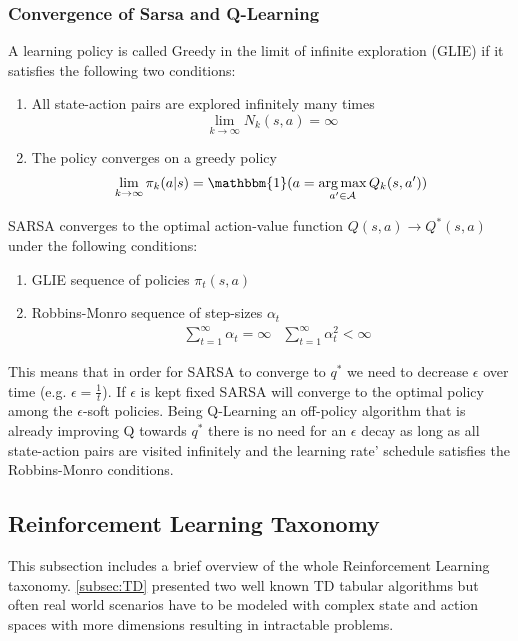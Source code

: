 \subsubsection{Convergence of Sarsa and Q-Learning}
\begin{definition}
    A learning policy is called Greedy in the limit of infinite exploration (GLIE) if it satisfies the following two conditions:
    \begin{enumerate}
        \item All state-action pairs are explored infinitely many times
        \begin{equation*}
            \lim_{k \to \infty}N_k(s,a) = \infty
        \end{equation*}
        \item The policy converges on a greedy policy
        \begin{equation*}
            \lim_{k \to \infty} \pi_k(a|s) = \mathbbm{1}(a = \argmax_{a' \in \mc{A}}Q_k(s,a'))
        \end{equation*}
    \end{enumerate}
\end{definition}

\begin{theorem}
    SARSA converges to the optimal action-value function $Q(s,a) \to Q^*(s,a)$ under the following conditions:
    \begin{enumerate}
        \item GLIE sequence of policies $\pi_t(s,a)$
        \item Robbins-Monro sequence of step-sizes $\alpha_t$
            \begin{align*}
                &\sum_{t=1}^\infty \alpha_t = \infty
                &\sum_{t=1}^\infty \alpha_t^2 < \infty
            \end{align*}
    \end{enumerate}
\end{theorem}

This means that in order for SARSA to converge to $q^*$ we need to decrease $\epsilon$ over time (e.g. $\epsilon = \frac{1}{t}$).
If $\epsilon$ is kept fixed SARSA will converge to the optimal policy among the $\epsilon$-soft policies.
Being Q-Learning an off-policy algorithm that is already improving Q towards $q^*$ there is no need for an $\epsilon$ decay as long as all state-action
pairs are visited infinitely and the learning rate' schedule satisfies the Robbins-Monro conditions.


\subsection{Reinforcement Learning Taxonomy}
This subsection includes a brief overview of the whole Reinforcement Learning taxonomy. \ref{subsec:TD} presented two well known TD tabular algorithms
but often real world scenarios have to be modeled with complex state and action spaces with more dimensions resulting in intractable problems.

